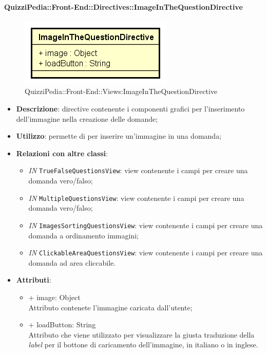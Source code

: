 \paragraph{QuizziPedia::Front-End::Directives::ImageInTheQuestionDirective}
\begin{figure} [ht]
	\centering
	\includegraphics[scale=0.45]{UML/Classi/Front-End/QuizziPedia_Front-end_ImageInTheQuestionDirective.png}
	\caption{QuizziPedia::Front-End::Views:ImageInTheQuestionDirective}
\end{figure} \FloatBarrier
\begin{itemize}
	\item \textbf{Descrizione}: directive contenente i componenti grafici per l'inserimento dell'immagine nella creazione delle domande;
	\item \textbf{Utilizzo}: permette di per inserire un'immagine in una domanda;
	\item \textbf{Relazioni con altre classi}:
	\begin{itemize}
		\item \textit{IN} \texttt{TrueFalseQuestionsView}: view contenente i campi per creare una domanda vero/falso; 
		\item \textit{IN} \texttt{MultipleQuestionsView}:  view contenente i campi per creare una domanda vero/falso; 
		\item \textit{IN} \texttt{ImagesSortingQuestionsView}: view contenente i campi per creare una domanda a ordinamento immagini;
		\item \textit{IN} \texttt{ClickableAreaQuestionsView}:  view contenente i campi per creare una domanda ad area cliccabile.
	\end{itemize}
	\item \textbf{Attributi}:
	\begin{itemize}
		\item {+ image: Object} \\ Attributo contenete l'immagine caricata dall'utente;
		\item {+ loadButton: String} \\ Attributo che viene utilizzato per visualizzare la giusta traduzione della \textit{label} per il bottone di caricamento dell'immagine, in italiano o in inglese. 
	\end{itemize}
\end{itemize}

